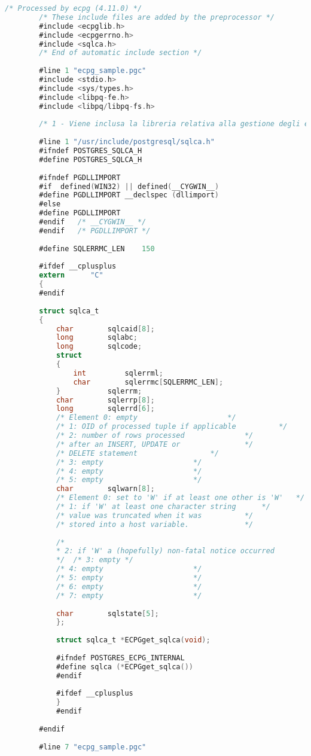 \documentclass[12pt,a4paper,onecolumn,x11names]{article}
\begin{document}
		\begin{lstlisting}[language=C, caption=testECPG.c]
		/* Processed by ecpg (4.11.0) */
		/* These include files are added by the preprocessor */
		#include <ecpglib.h>
		#include <ecpgerrno.h>
		#include <sqlca.h>
		/* End of automatic include section */
		
		#line 1 "ecpg_sample.pgc"
		#include <stdio.h>
		#include <sys/types.h>
		#include <libpq-fe.h>
		#include <libpq/libpq-fs.h>
		
		/* 1 - Viene inclusa la libreria relativa alla gestione degli errori tramite la variabile globale sqlca (SQL communication area) */
		
		#line 1 "/usr/include/postgresql/sqlca.h"
		#ifndef POSTGRES_SQLCA_H
		#define POSTGRES_SQLCA_H
		
		#ifndef PGDLLIMPORT
		#if  defined(WIN32) || defined(__CYGWIN__)
		#define PGDLLIMPORT __declspec (dllimport)
		#else
		#define PGDLLIMPORT
		#endif   /* __CYGWIN__ */
		#endif   /* PGDLLIMPORT */
		
		#define SQLERRMC_LEN	150
		
		#ifdef __cplusplus
		extern		"C"
		{
		#endif
		
		struct sqlca_t
		{
			char		sqlcaid[8];
			long		sqlabc;
			long		sqlcode;
			struct
			{
				int			sqlerrml;
				char		sqlerrmc[SQLERRMC_LEN];
			}			sqlerrm;
			char		sqlerrp[8];
			long		sqlerrd[6];
			/* Element 0: empty						*/
			/* 1: OID of processed tuple if applicable			*/
			/* 2: number of rows processed				*/
			/* after an INSERT, UPDATE or				*/
			/* DELETE statement					*/
			/* 3: empty						*/
			/* 4: empty						*/
			/* 5: empty						*/
			char		sqlwarn[8];
			/* Element 0: set to 'W' if at least one other is 'W'	*/
			/* 1: if 'W' at least one character string		*/
			/* value was truncated when it was			*/
			/* stored into a host variable.             */
			
			/*
			* 2: if 'W' a (hopefully) non-fatal notice occurred
			*/	/* 3: empty */
			/* 4: empty						*/
			/* 5: empty						*/
			/* 6: empty						*/
			/* 7: empty						*/
			
			char		sqlstate[5];
			};
		
			struct sqlca_t *ECPGget_sqlca(void);
			
			#ifndef POSTGRES_ECPG_INTERNAL
			#define sqlca (*ECPGget_sqlca())
			#endif
			
			#ifdef __cplusplus
			}
			#endif
		
		#endif
		
		#line 7 "ecpg_sample.pgc"
		

\end{lstlisting}
\end{document}

